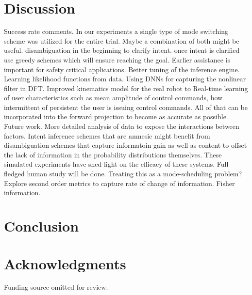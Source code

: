 \documentclass[conference]{IEEEtran}
\begin{document}
\section{Discussion}\label{sec:discussions}
Success rate comments. 
In our experiments a single type of mode switching scheme was utilized for the entire trial. Maybe a combination of both might be useful. disambiguation in the beginning to clarify intent. once intent is clarified use greedy schemes which will ensure reaching the goal. 
Earlier assistance is important for safety critical applications.
Better tuning of the inference engine. Learning likelihood functions from data. Using DNNs for capturing the nonlinear filter in DFT. Improved kinematics model for the real robot to Real-time learning of user characteristics such as mean amplitude of control commands, how intermittent of persistent the user is issuing control commands. All of that can be incorporated into the forward projection to become as accurate as possible. 
Future work. More detailed analysis of data to expose the interactions between factors. Intent inference schemes that are amnesic might benefit from disambiguation schemes that capture informatoin gain as well as content to offset the lack of information in the probability distributions themselves. These simulated experiments have shed light on the efficacy of these systems. Full fledged human study will be done. Treating this as a mode-scheduling problem?
Explore second order metrics to capture rate of change of information. Fisher information. 


\section{Conclusion}\label{sec:conclusions}


\section*{Acknowledgments}
Funding source omitted for review. 
\balance


\end{document}
